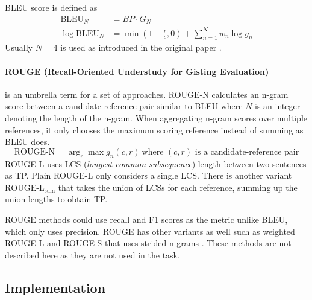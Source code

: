 \documentclass{article}
\begin{document}
BLEU score is defined as
\begin{align}
    \text{BLEU}_N &= BP\cdot G_N\\
    \log\text{BLEU}_N &= \min(1-\frac{r}{c},0)+\sum_{n=1}^{N}w_n\log g_n
\end{align}
Usually $N=4$ is used as introduced in the original paper \cite{papineni_bleu_2002}.
\paragraph{ROUGE (Recall-Oriented Understudy for
Gisting Evaluation)}
is an umbrella term for a set of approaches. ROUGE-N calculates an n-gram score between a candidate-reference pair similar to BLEU where $N$ is an integer denoting the length of the n-gram. When aggregating n-gram scores over multiple references, it only chooses the maximum scoring reference instead of summing as BLEU does.
\begin{equation}
    \text{ROUGE-N} = \arg_r\max g_n(c,r)\ \scriptstyle{\text{where $(c,r)$ is a candidate-reference pair}}
\end{equation}
ROUGE-L uses LCS (\textit{longest common subsequence}) length between two sentences as TP. Plain ROUGE-L only considers a single LCS. There is another variant $\text{ROUGE-L}_{\text{sum}}$ that takes the union of LCSs for each reference, summing up the union lengths to obtain TP.

ROUGE methods could use recall and F1 scores as the metric unlike BLEU, which only uses precision. ROUGE has other variants as well such as weighted ROUGE-L and ROUGE-S that uses strided n-grams \cite{lin_rouge_2004}. These methods are not described here as they are not used in the task.
\subsection{Implementation}
\end{document}
